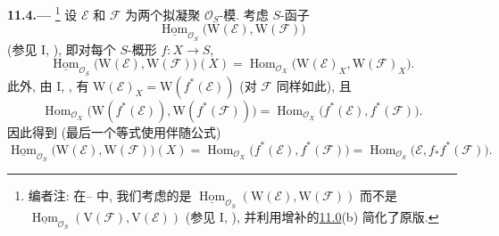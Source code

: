 
\medskip
{}\label{par:sga3-VIB-11.4}%
\noindent\textbf{11.4.---}%
\footnote{\label{note:sga3-VIB-108}编者注: 在-- 中,
我们考虑的是
\(\underline{\operatorname{Hom}}_{\mathcal O_S}
  (\mathrm W(\mathcal E),\mathrm W(\mathcal F))\)
而不是
\(\underline{\operatorname{Hom}}_{\mathcal O_S}
  (\mathrm V(\mathcal F),\mathrm V(\mathcal E))\)
\textup{(参见 I, )},
并利用增补的\hyperref[concl:sga3-VIB-11.0-b]{11.0}\textup{(b)} 简化了原版.}
设 \(\mathcal E\) 和 \(\mathcal F\) 为两个拟凝聚 \(\mathcal O_S\)-模.
考虑 \(S\)-函子
\[
  \underline{\operatorname{Hom}}_{\mathcal O_S}
    \bigl(\mathrm W(\mathcal E),\mathrm W(\mathcal F)\bigr)
\]
\textup{(参见 I, )},
即对每个 \(S\)-概形 \(f:X\to S\),
\label{form:sga3-VIB-11.4-HomX}%
\[
  \underline{\operatorname{Hom}}_{\mathcal O_S}
    \bigl(\mathrm W(\mathcal E),\mathrm W(\mathcal F)\bigr)(X)
  =
  \operatorname{Hom}_{\mathcal O_X}
    \bigl(\mathrm W(\mathcal E)_X,\mathrm W(\mathcal F)_X\bigr).
\]
此外, 由 I, , 有
\(\mathrm W(\mathcal E)_X=\mathrm W(f^*(\mathcal E))\)
\textup{(对 \(\mathcal F\) 同样如此)}, 且
\[
  \operatorname{Hom}_{\mathcal O_X}
    \bigl(\mathrm W(f^*(\mathcal E)),
          \mathrm W(f^*(\mathcal F))\bigr)
  =
  \operatorname{Hom}_{\mathcal O_X}
    \bigl(f^*(\mathcal E),f^*(\mathcal F)\bigr).
\]
因此得到 \textup{(最后一个等式使用伴随公式)}
\label{form:sga3-VIB-11.4-adjunction}%
\[
  \tag{\(\dagger\)}
  \underline{\operatorname{Hom}}_{\mathcal O_S}
    \bigl(\mathrm W(\mathcal E),\mathrm W(\mathcal F)\bigr)(X)
  =
  \operatorname{Hom}_{\mathcal O_X}
    \bigl(f^*(\mathcal E),f^*(\mathcal F)\bigr)
  =
  \operatorname{Hom}_{\mathcal O_S}
    \bigl(\mathcal E,f_*f^*(\mathcal F)\bigr).
\]

